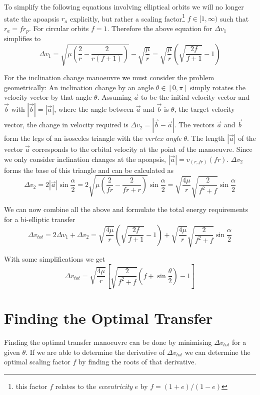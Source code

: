 \documentclass[a4paper, 11pt]{article}
\begin{document}
To simplify the following equations involving elliptical orbits we will no longer state the apoapsis $r_a$ explicitly, but rather a scaling factor\footnote{this factor $f$ relates to the \emph{eccentricity} $e$ by $f=(1+e)/(1-e)$} $f \in [1, \infty)$ such that $r_a = fr_p$. For circular orbits $f=1$. Therefore the above equation for $\Delta{}v_1$ simplifies to
$$\Delta{}v_1
= \sqrt{\mu\left(\frac{2}{r}-\frac{2}{r(f+1)}\right)} - \sqrt{\frac{\mu}{r}}
= \sqrt{\frac{\mu}r}\left(   \sqrt{\frac{2f}{f+1}} - 1  \right)
$$

For the inclination change manoeuvre we must consider the problem geometrically: An inclination change by an angle $\theta \in [0,\pi]$ simply rotates the velocity vector by that angle $\theta$. Assuming $\vec{a}$ to be the initial velocity vector and $\vec{b}$ with $|\vec{b}| = |\vec{a}|$, where the angle between $\vec{a}$ and $\vec{b}$ is $\theta$, the target velocity vector, the change in velocity required is $\Delta{}v_2 = |\vec{b} - \vec{a}|$. The vectors $\vec{a}$ and $\vec{b}$ form the legs of an isosceles triangle with the \emph{vertex angle} $\theta$.
The length $|\vec{a}|$ of the vector $\vec{a}$ corresponds to the orbital velocity at the point of the manoeuvre. Since we only consider inclination changes at the apoapsis, $|\vec{a}| = v_{(r,fr)}(fr)$. $\Delta{}v_2$ forms the base of this triangle and can be calculated as
$$\Delta{}v_2
= 2|\vec{a}|\sin\frac{\alpha}2
= 2\sqrt{  \mu \left(  \frac{2}{fr} - \frac{2}{fr + r}  \right) } \sin\frac{\alpha}2
= \sqrt{\frac{4\mu}r} \sqrt{\frac{2}{f^2+f}} \sin\frac{\alpha}2
$$

We can now combine all the above and formulate the total energy requirements for a bi-elliptic transfer
$$\Delta{}v_{tot}
= 2\Delta{}v_1 + \Delta{}v_2
= \sqrt{\frac{4\mu}r}\left( \sqrt{\frac{2f}{f+1}} - 1  \right) + \sqrt{\frac{4\mu}r} \sqrt{\frac{2}{f^2+f}} \sin\frac{\alpha}2$$

With some simplifications we get
$$\Delta{}v_{tot}= \sqrt{\frac{4\mu}r}\left[ \sqrt{\frac{2}{f^2 + f}} \left(f + \sin\frac{\theta}2 \right) - 1  \right]$$

\section{Finding the Optimal Transfer}
Finding the optimal transfer manoeuvre can be done by minimising $\Delta{}v_{tot}$ for a given $\theta$. If we are able to determine the derivative of $\Delta v_{tot}$ we can determine the optimal scaling factor $f$ by finding the roots of that derivative.
\end{document}
